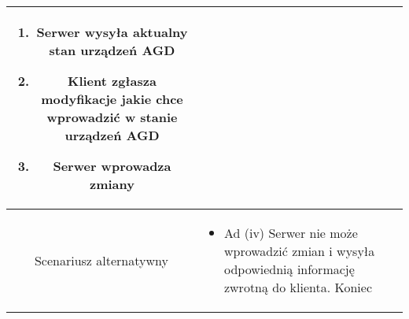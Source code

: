 \documentclass{article}
\begin{document}
\begin{enumerate}
\begin{enumerate}
\begin{table}[H]
\begin{tabular}{|c|p{7cm}|}
\begin{enumerate}
\item Serwer wysyła aktualny stan urządzeń AGD

\item Klient zgłasza modyfikacje jakie chce wprowadzić w stanie urządzeń AGD

\item Serwer wprowadza zmiany\end{enumerate} \\
						\hline
						Scenariusz alternatywny & \begin{itemize}\item Ad (iv) Serwer nie może wprowadzić zmian i wysyła odpowiednią informację zwrotną do klienta. Koniec\end{itemize}                                                                                                                                              \\
						\hline
					\end{tabular}
				\end{table}


\end{enumerate}
\end{enumerate}
\end{document}
